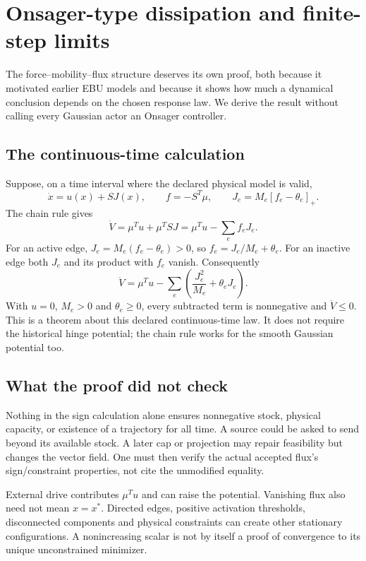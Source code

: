 \chapter{Onsager-type dissipation and finite-step limits}\label{ch:dissipation}
The force--mobility--flux structure deserves its own proof, both because it
motivated earlier EBU models and because it shows how much a dynamical
conclusion depends on the chosen response law. We derive the result without
calling every Gaussian actor an Onsager controller.

\section{The continuous-time calculation}
Suppose, on a time interval where the declared physical model is valid,
\begin{equation}
 \dot x=u(x)+SJ(x),\qquad f=-S^T\mu,
 \qquad J_e=M_e[f_e-\theta_e]_+.
\end{equation}
The chain rule gives
\begin{equation}
 \dot V=\mu^Tu+\mu^TSJ=\mu^Tu-\sum_e f_eJ_e.
\end{equation}
For an active edge, $J_e=M_e(f_e-\theta_e)>0$, so
$f_e=J_e/M_e+\theta_e$. For an inactive edge both $J_e$ and its product
with $f_e$ vanish. Consequently
\begin{equation}\label{eq:dissipation}
 \dot V=\mu^Tu-\sum_e\left(\frac{J_e^2}{M_e}+\theta_eJ_e\right).
\end{equation}
With $u=0$, $M_e>0$ and $\theta_e\geq0$, every subtracted term is
nonnegative and $\dot V\leq0$. This is a theorem about this declared
continuous-time law. It does not require the historical hinge potential;
the chain rule works for the smooth Gaussian potential too.

\section{What the proof did not check}
Nothing in the sign calculation alone ensures nonnegative stock, physical
capacity, or existence of a trajectory for all time. A source could be asked
to send beyond its available stock. A later cap or projection may repair
feasibility but changes the vector field. One must then verify the actual
accepted flux's sign/constraint properties, not cite the unmodified equality.

External drive contributes $\mu^Tu$ and can raise the potential. Vanishing
flux also need not mean $x=x^*$. Directed edges, positive activation
thresholds, disconnected components and physical constraints can create
other stationary configurations. A nonincreasing scalar is not by itself a
proof of convergence to its unique unconstrained minimizer.

